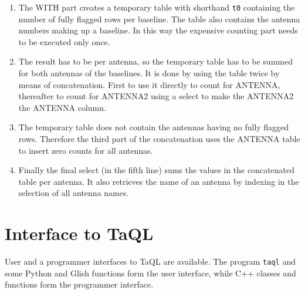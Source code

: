 \begin{enumerate}
\item
The WITH part creates a temporary table with shorthand {\tt t0}
containing the number of fully flagged rows per baseline.
The table also contains the antenna numbers making up a baseline.
In this way the expensive counting part needs to be executed only once.
\item
The result has to be per antenna, so the temporary table has to be
summed for both antennas of the baselines. It is done by using the
table twice by means of concatenation. First to use it
directly to count for ANTENNA, thereafter to count for ANTENNA2 using a
select to make the ANTENNA2 the ANTENNA column. 
\item
The temporary table does not contain the antennas having no fully flagged
rows. Therefore the third part of the concatenation
uses the ANTENNA table to insert zero counts for all antennas.
\item
Finally the final select (in the fifth line) sums the values in the
concatenated table per antenna. It also retrieves the name of an
antenna by indexing in the selection of all antenna names.
\end{enumerate}



\section{\label{TAQL:GLISHPC}Interface to TaQL}
User and a programmer interfaces to TaQL are available.
The program \texttt{taql} and some Python and Glish functions form the
user interface, while C++ classes and functions
form the programmer interface.

